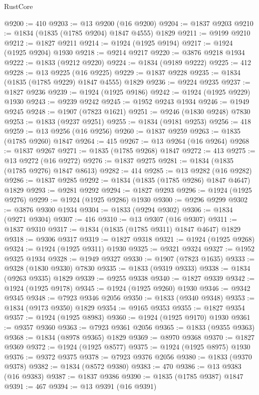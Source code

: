 \begin{lexlean}{RustCore}
\begin{coremodule}
@9200 := 410
@9203 := @13 @9200 (@16 @9200)
@9204 := @1837 @9203
@9210 := @1834 (@1835 (@1785 @9204) @1847 @4555) @1829
@9211 := @9199 @9210
@9212 := @1827 @9211
@9214 := @1924 (@1925 @9194)
@9217 := @1924 (@1925 @9204) @1930
@9218 := @9214 @9217
@9220 := @3876 @9218 @1934
@9222 := @1833 (@9212 @9220)
@9224 := @1834 (@9189 @9222)
@9225 := 412
@9228 := @13 @9225 (@16 @9225)
@9229 := @1837 @9228
@9235 := @1834 (@1835 (@1785 @9229) @1847 @4555) @1829
@9236 := @9224 @9235
@9237 := @1827 @9236
@9239 := @1924 (@1925 @9186)
@9242 := @1924 (@1925 @9229) @1930
@9243 := @9239 @9242
@9245 := @1952 @9243 @1934
@9246 := @1949 @9245
@9248 := @1907 (@7823 @1621)
@9251 := @9246 (@1830 @9248) @7830
@9253 := @1833 (@9237 @9251)
@9255 := @1834 (@9181 @9253)
@9256 := 418
@9259 := @13 @9256 (@16 @9256)
@9260 := @1837 @9259
@9263 := @1835 (@1785 @9260) @1847
@9264 := 415
@9267 := @13 @9264 (@16 @9264)
@9268 := @1837 @9267
@9271 := @1835 (@1785 @9268) @1847
@9272 := 413
@9275 := @13 @9272 (@16 @9272)
@9276 := @1837 @9275
@9281 := @1834 (@1835 (@1785 @9276) @1847 @8613)
@9282 := 414
@9285 := @13 @9282 (@16 @9282)
@9286 := @1837 @9285
@9292 := @1834 (@1835 (@1785 @9286) @1847 @4647) @1829
@9293 := @9281 @9292
@9294 := @1827 @9293
@9296 := @1924 (@1925 @9276)
@9299 := @1924 (@1925 @9286) @1930
@9300 := @9296 @9299
@9302 := @3876 @9300 @1934
@9304 := @1833 (@9294 @9302)
@9306 := @1834 (@9271 @9304)
@9307 := 416
@9310 := @13 @9307 (@16 @9307)
@9311 := @1837 @9310
@9317 := @1834 (@1835 (@1785 @9311) @1847 @4647) @1829
@9318 := @9306 @9317
@9319 := @1827 @9318
@9321 := @1924 (@1925 @9268)
@9324 := @1924 (@1925 @9311) @1930
@9325 := @9321 @9324
@9327 := @1952 @9325 @1934
@9328 := @1949 @9327
@9330 := @1907 (@7823 @1635)
@9333 := @9328 (@1830 @9330) @7830
@9335 := @1833 (@9319 @9333)
@9338 := @1834 (@9263 @9335) @1829
@9339 := @9255 @9338
@9340 := @1827 @9339
@9342 := @1924 (@1925 @9178)
@9345 := @1924 (@1925 @9260) @1930
@9346 := @9342 @9345
@9348 := @7923 @9346 @2056
@9350 := @1833 (@9340 @9348)
@9353 := @1834 (@9173 @9350) @1829
@9354 := @9165 @9353
@9355 := @1827 @9354
@9357 := @1924 (@1925 @8983)
@9360 := @1924 (@1925 @9170) @1930
@9361 := @9357 @9360
@9363 := @7923 @9361 @2056
@9365 := @1833 (@9355 @9363)
@9368 := @1834 (@8978 @9365) @1829
@9369 := @8970 @9368
@9370 := @1827 @9369
@9372 := @1924 (@1925 @8577)
@9375 := @1924 (@1925 @8975) @1930
@9376 := @9372 @9375
@9378 := @7923 @9376 @2056
@9380 := @1833 (@9370 @9378)
@9382 := @1834 (@8572 @9380)
@9383 := 470
@9386 := @13 @9383 (@16 @9383)
@9387 := @1837 @9386
@9390 := @1835 (@1785 @9387) @1847
@9391 := 467
@9394 := @13 @9391 (@16 @9391)

\end{coremodule}
\end{lexlean}
